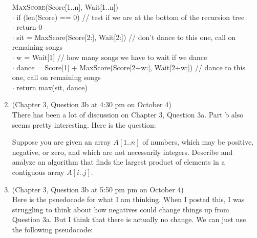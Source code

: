 \documentclass{article}
\begin{document}
\begin{enumerate}
        \begin{algorithm}
            \textsc{MaxScore}(Score[1..n], Wait[1..n]) \\
            $\cdot $ \hspace{1em} if (len(Score) == 0) \hspace{9em} // test if we are at the bottom of the recursion tree \\
            $\cdot $ \hspace{2em} return 0 \\
            $\cdot $ \hspace{1em} sit = MaxScore(Score[2:], Wait[2:]) \hspace{2em} // don't dance to this one, call on remaining songs \\
            $\cdot $ \hspace{1em} w = Wait[1] \hspace{12em} // how many songs we have to wait if we dance \\
            $\cdot $ \hspace{1em} dance = Score[1] + MaxScore(Score[2+w:], Wait[2+w:]) \hspace{0.25em} // dance to this one, call on remaining songs \\
            $\cdot $ \hspace{1em} return max(sit, dance)
        \end{algorithm}
    \item (Chapter 3, Question 3b at 4:30 pm on October 4) \\
        There has been a lot of discussion on Chapter 3, Question 3a. Part b also seems pretty interesting. Here is the question:

        Suppose you are given an array $A[1..n]$ of numbers, which may be positive, negative, or zero, and which are not necessarily integers.
        Describe and analyze an algorithm that finds the largest product of elements in a contiguous array $A[i..j]$.
    \item (Chapter 3, Question 3b at 5:50 pm pm on October 4) \\
        Here is the psuedocode for what I am thinking. When I posted this, I was struggling to think about how negatives could change things up from Question 3a. But I think that there is actually no change. We can just use the following pseudocode:


\end{enumerate}
\end{document}
